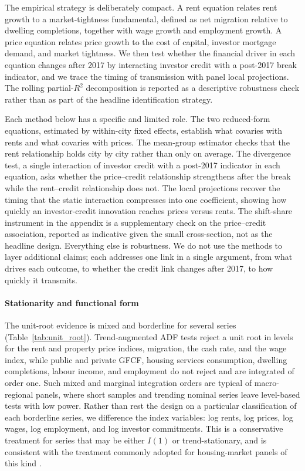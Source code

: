 \documentclass[preprint,11pt,authoryear]{elsarticle}
\begin{document}
The empirical strategy is deliberately compact. A rent equation relates
rent growth to a market-tightness fundamental, defined as net migration
relative to dwelling completions, together with wage growth and
employment growth. A price equation relates price growth to the cost of
capital, investor mortgage demand, and market tightness. We then test
whether the financial driver in each equation changes after 2017 by
interacting investor credit with a post-2017 break indicator, and we
trace the timing of transmission with panel local projections. The
rolling partial-\(R^2\) decomposition is reported as a descriptive
robustness check rather than as part of the headline identification
strategy.

Each method below has a specific and limited role. The two reduced-form
equations, estimated by within-city fixed effects, establish what
covaries with rents and what covaries with prices. The mean-group
estimator checks that the rent relationship holds city by city rather
than only on average. The divergence test, a single interaction of
investor credit with a post-2017 indicator in each equation, asks whether
the price--credit relationship strengthens after the break while the
rent--credit relationship does not. The local projections recover the
timing that the static interaction compresses into one coefficient,
showing how quickly an investor-credit innovation reaches prices versus
rents. The shift-share instrument in the appendix is a supplementary
check on the price--credit association, reported as indicative given the
small cross-section, not as the headline design. Everything else is
robustness. We do not use the methods to layer additional claims; each
addresses one link in a single argument, from what drives each outcome,
to whether the credit link changes after 2017, to how quickly it
transmits.

\paragraph{Stationarity and functional form}

The unit-root evidence is mixed and borderline for several series
(Table~\ref{tab:unit_root}). Trend-augmented ADF tests reject a unit root
in levels for the rent and property price indices, migration, the cash
rate, and the wage index, while public and private GFCF, housing services
consumption, dwelling completions, labour income, and employment do not
reject and are integrated of order one. Such mixed and marginal
integration orders are typical of macro-regional panels, where short
samples and trending nominal series leave level-based tests with low
power. Rather than rest the design on a particular classification of each
borderline series, we difference the index variables: log rents, log
prices, log wages, log employment, and log investor commitments. This is
a conservative treatment for series that may be either $I(1)$ or
trend-stationary, and is consistent with the treatment commonly adopted
for housing-market panels of this kind \citep{kenny1999modelling}.
\end{document}
